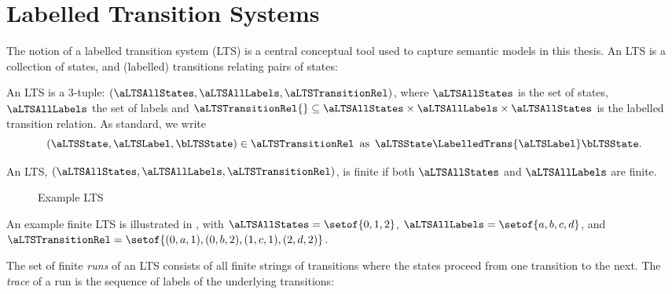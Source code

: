 \section{Labelled Transition Systems}

The notion of a labelled transition system (LTS) is a central conceptual tool
used to capture semantic models in this thesis. An LTS is a collection of
states, and (labelled) transitions relating pairs of states:

\begin{definition}[LTS]
An LTS is a 3-tuple: $(\aLTSAllStates,
\aLTSAllLabels, \aLTSTransitionRel)$, where $\aLTSAllStates$ is the set of
states, $\aLTSAllLabels$ the set of labels and $\aLTSTransitionRel{} \subseteq
\aLTSAllStates \times \aLTSAllLabels \times \aLTSAllStates$ is the labelled
transition relation. As standard, we write
\[
    (\aLTSState, \aLTSLabel, \bLTSState) \in{} \mathord{\aLTSTransitionRel}
    \,\text{ as }\,
    \aLTSState \LabelledTrans{\aLTSLabel} \bLTSState.
\]
\end{definition}

\begin{definition}
    An LTS, $(\aLTSAllStates, \aLTSAllLabels, \aLTSTransitionRel)$, is finite
    if both $\aLTSAllStates$ and $\aLTSAllLabels$ are finite.
\end{definition}

\begin{figure}[ht]
    \centering
\caption{Example LTS}
\label{fig:exampleLTS}
\end{figure}

\begin{example}
An example finite LTS is illustrated in , with
$\aLTSAllStates = \setof{0,1,2}$, $\aLTSAllLabels = \setof{a,b,c,d}$, and\\
$\mathord{\aLTSTransitionRel} = \setof{(0,a,1), (0,b,2), (1,c,1), (2,d,2)}$.
\end{example}

The set of finite \emph{runs} of an LTS consists of all finite strings of
transitions where the states proceed from one transition to the next. The
\emph{trace} of a run is the sequence of labels of the underlying transitions:

